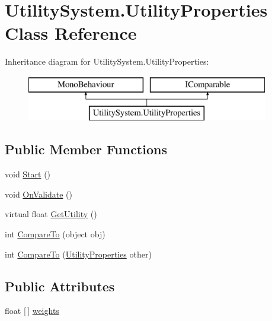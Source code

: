 \hypertarget{class_utility_system_1_1_utility_properties}{}\section{Utility\+System.\+Utility\+Properties Class Reference}
\label{class_utility_system_1_1_utility_properties}
Inheritance diagram for Utility\+System.\+Utility\+Properties\+:\begin{figure}[H]
\begin{center}
\leavevmode
\includegraphics[height=2.000000cm]{class_utility_system_1_1_utility_properties}
\end{center}
\end{figure}
\subsection*{Public Member Functions}
\begin{DoxyCompactItemize}
\item 
void \mbox{\hyperlink{class_utility_system_1_1_utility_properties_a9919d860fe70280710b938d2946a7d0a}{Start}} ()
\item 
void \mbox{\hyperlink{class_utility_system_1_1_utility_properties_ac37ea8be2246d96257bf94ff9b22ec98}{On\+Validate}} ()
\item 
virtual float \mbox{\hyperlink{class_utility_system_1_1_utility_properties_a8a6f5a57649bcd38f2e880a4afcd719d}{Get\+Utility}} ()
\item 
int \mbox{\hyperlink{class_utility_system_1_1_utility_properties_a0b6edfa9fe4c35ca1f2b2ce91b27b379}{Compare\+To}} (object obj)
\item 
int \mbox{\hyperlink{class_utility_system_1_1_utility_properties_a152bc86d4852fe36a2bee38e478b44ad}{Compare\+To}} (\mbox{\hyperlink{class_utility_system_1_1_utility_properties}{Utility\+Properties}} other)
\end{DoxyCompactItemize}
\subsection*{Public Attributes}
\begin{DoxyCompactItemize}
\item 
float \mbox{[}$\,$\mbox{]} \mbox{\hyperlink{class_utility_system_1_1_utility_properties_abb078a8e18ca126eec98a9cc1dd3f703}{weights}}
\end{DoxyCompactItemize}


